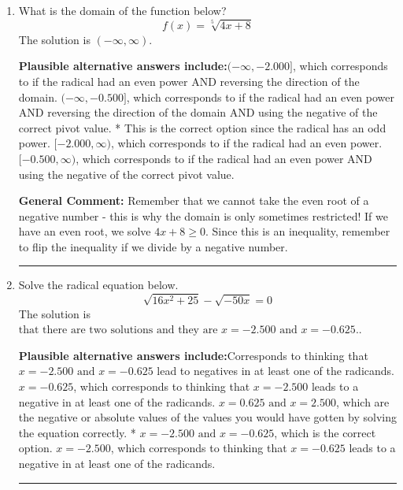 \documentclass{extbook}[14pt]
\newcommand{\litem}[1]{\item #1

\rule{\textwidth}{0.4pt}}
\begin{document}
\begin{enumerate}\litem{
What is the domain of the function below?
\[ f(x) = \sqrt[5]{4 x + 8} \]The solution is \( (-\infty, \infty) \).\begin{enumerate}[label=\Alph*.]
\textbf{Plausible alternative answers include:}$(-\infty, -2.000]$, which corresponds to if the radical had an even power AND reversing the direction of the domain.
$(-\infty, -0.500]$, which corresponds to if the radical had an even power AND reversing the direction of the domain AND using the negative of the correct pivot value.
* This is the correct option since the radical has an odd power.
$[-2.000, \infty)$, which corresponds to if the radical had an even power.
$[-0.500, \infty)$, which corresponds to if the radical had an even power AND using the negative of the correct pivot value.
\end{enumerate}

\textbf{General Comment:} Remember that we cannot take the even root of a negative number - this is why the domain is only sometimes restricted! If we have an even root, we solve $4 x + 8 \geq 0$. Since this is an inequality, remember to flip the inequality if we divide by a negative number.
}
\litem{
Solve the radical equation below.
\[ \sqrt{16 x^2 + 25} - \sqrt{-50 x} = 0 \]The solution is \( \text{that there are two solutions and they are } x = -2.500 \text{ and } x = -0.625. \).\begin{enumerate}[label=\Alph*.]
\textbf{Plausible alternative answers include:}Corresponds to thinking that $x = -2.500 \text{ and } x = -0.625$ lead to negatives in at least one of the radicands.
$x = -0.625$, which corresponds to thinking that $x = -2.500$ leads to a negative in at least one of the radicands.
$x = 0.625 \text{ and } x = 2.500$, which are the negative or absolute values of the values you would have gotten by solving the equation correctly.
* $x = -2.500 \text{ and } x = -0.625$, which is the correct option.
$x = -2.500$, which corresponds to thinking that $x = -0.625$ leads to a negative in at least one of the radicands.
\end{enumerate}

}
\end{enumerate}
\end{document}
